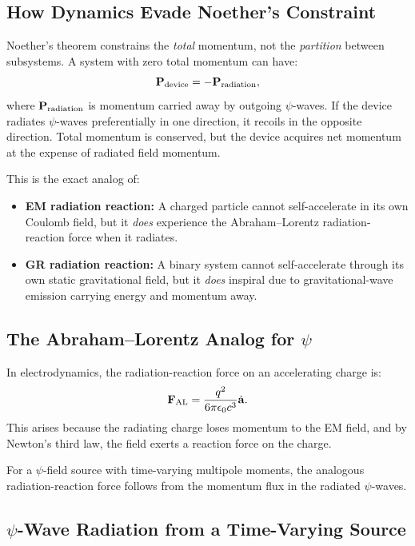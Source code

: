 \documentclass[11pt]{article}
\newcommand{\avec}{\mathbf{a}}
\begin{document}
\subsection{How Dynamics Evade Noether's Constraint}

Noether's theorem constrains the \emph{total} momentum, not the
\emph{partition} between subsystems. A system with zero total momentum
can have:
\begin{equation}
\mathbf{P}_{\rm device} = -\mathbf{P}_{\rm radiation},
\end{equation}
where $\mathbf{P}_{\rm radiation}$ is momentum carried away by
outgoing $\psi$-waves. If the device radiates $\psi$-waves
preferentially in one direction, it recoils in the opposite direction.
Total momentum is conserved, but the device acquires net momentum at
the expense of radiated field momentum.

This is the exact analog of:
\begin{itemize}
\item \textbf{EM radiation reaction:} A charged particle cannot
  self-accelerate in its own Coulomb field, but it \emph{does}
  experience the Abraham--Lorentz radiation-reaction force when it
  radiates.
\item \textbf{GR radiation reaction:} A binary system cannot
  self-accelerate through its own static gravitational field, but it
  \emph{does} inspiral due to gravitational-wave emission carrying
  energy and momentum away.
\end{itemize}

\subsection{The Abraham--Lorentz Analog for $\psi$}

In electrodynamics, the radiation-reaction force on an accelerating
charge is:
\begin{equation}
\mathbf{F}_{\rm AL} = \frac{q^2}{6\pi\epsilon_0 c^3}\dot{\avec}.
\end{equation}
This arises because the radiating charge loses momentum to the EM
field, and by Newton's third law, the field exerts a reaction force
on the charge.

For a $\psi$-field source with time-varying multipole moments, the
analogous radiation-reaction force follows from the momentum flux
in the radiated $\psi$-waves.

\subsection{$\psi$-Wave Radiation from a Time-Varying Source}
\end{document}
